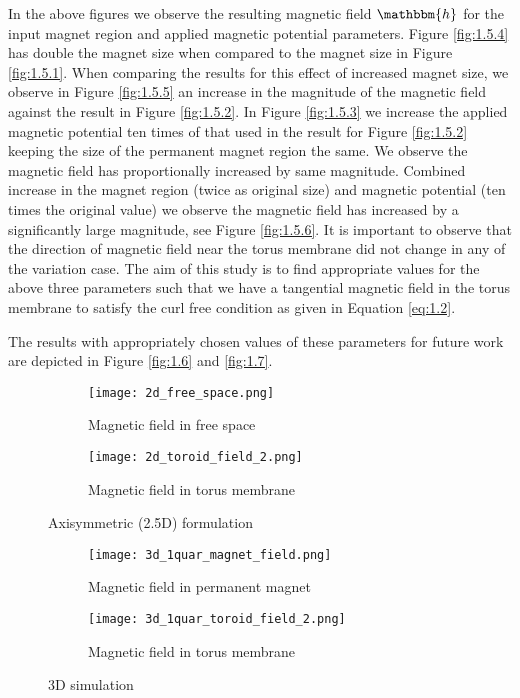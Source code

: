 In the above figures we observe the resulting magnetic field $\mathbbm{h}$ for the input magnet region and applied magnetic potential parameters. Figure \eqref{fig:1.5.4} has double the magnet size when compared to the magnet size in Figure \eqref{fig:1.5.1}. When comparing the results for this effect of increased magnet size, we observe in Figure \eqref{fig:1.5.5} an increase in the magnitude of the magnetic field against the result in Figure \eqref{fig:1.5.2}. In Figure \eqref{fig:1.5.3} we increase the applied magnetic potential ten times of that used in the result for Figure \eqref{fig:1.5.2} keeping the size of the permanent magnet region the same. We observe the magnetic field has proportionally increased by same magnitude. Combined increase in the magnet region (twice as original size) and magnetic potential (ten times the original value) we observe the magnetic field has increased by a significantly large magnitude, see Figure \eqref{fig:1.5.6}. It is important to observe that the direction of magnetic field near the torus membrane did not change in any of the variation case. The aim of this study is to find appropriate values for the above three parameters such that we have a tangential magnetic field in the torus membrane to satisfy the curl free condition as given in Equation \eqref{eq:1.2}. \par 

The results with appropriately chosen values of these parameters for future work are depicted in Figure \eqref{fig:1.6} and \eqref{fig:1.7}.

\begin{figure}[h]
\centering
\begin{subfigure}{0.49\textwidth}
\centering
\texttt{[image: 2d\_free\_space.png]}
\caption{Magnetic field in free space}
\label{fig:1.6.1}
\end{subfigure}
\begin{subfigure}{0.49\textwidth}
\centering
\texttt{[image: 2d\_toroid\_field\_2.png]}
\caption{Magnetic field in torus membrane}
\label{fig:1.6.2}
\end{subfigure}
\caption{Axisymmetric (2.5D) formulation}
\label{fig:1.6}
\end{figure}

\begin{figure}[h]
\centering
\begin{subfigure}{0.49\textwidth}
\centering
\texttt{[image: 3d\_1quar\_magnet\_field.png]}
\caption{Magnetic field in permanent magnet}
\label{fig:1.7.1}
\end{subfigure}
\begin{subfigure}{0.49\textwidth}
\centering
\texttt{[image: 3d\_1quar\_toroid\_field\_2.png]}
\caption{Magnetic field in torus membrane}
\label{fig:1.7.2}
\end{subfigure}
\caption{3D simulation}
\label{fig:1.7}
\end{figure}
